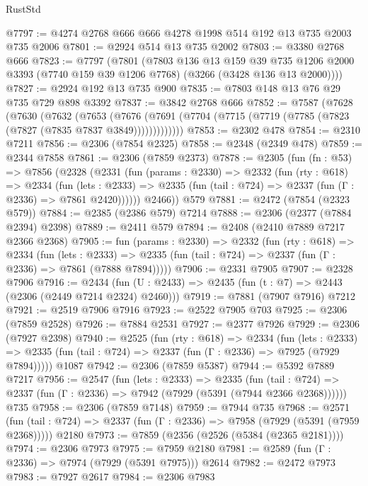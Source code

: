 \begin{lexlean}{RustStd}
\begin{coremodule}
@7797 := @4274 @2768 @666 @666 @4278 @1998 @514 @192 @13 @735 @2003 @735 @2006
@7801 := @2924 @514 @13 @735 @2002
@7803 := @3380 @2768 @666
@7823 := @7797
    (@7801
      (@7803
        @136
        @13
        @159
        @39
        @735
        @1206
        @2000
        @3393
        (@7740 @159 @39 @1206 @7768)
        (@3266 (@3428 @136 @13 @2000))))
@7827 := @2924 @192 @13 @735 @900
@7835 := @7803 @148 @13 @76 @29 @735 @729 @898 @3392
@7837 := @3842 @2768 @666
@7852 := @7587
    (@7628
      (@7630
        (@7632
          (@7653
            (@7676 (@7691 (@7704 (@7715 (@7719 (@7785 (@7823 (@7827 (@7835 @7837 @3849)))))))))))))
@7853 := @2302 @478
@7854 := @2310 @7211
@7856 := @2306 (@7854 @2325)
@7858 := @2348 (@2349 @478)
@7859 := @2344 @7858
@7861 := @2306 (@7859 @2373)
@7878 := @2305
    (fun (fn : @53) =>
    @7856
      (@2328
        (@2331
          (fun (params : @2330) =>
          @2332
            (fun (rty : @618) =>
            @2334
              (fun (lets : @2333) =>
              @2335 (fun (tail : @724) => @2337 (fun (Γ : @2336) => @7861 @2420))))))
        @2466))
    @579
@7881 := @2472 (@7854 (@2323 @579))
@7884 := @2385 (@2386 @579) @7214
@7888 := @2306 (@2377 (@7884 @2394) @2398)
@7889 := @2411 @579
@7894 := @2408 (@2410 @7889 @7217 @2366 @2368)
@7905 := fun (params : @2330) =>
  @2332
    (fun (rty : @618) =>
    @2334
      (fun (lets : @2333) =>
      @2335 (fun (tail : @724) => @2337 (fun (Γ : @2336) => @7861 (@7888 @7894)))))
@7906 := @2331 @7905
@7907 := @2328 @7906
@7916 := @2434 (fun (U : @2433) => @2435 (fun (t : @7) => @2443 (@2306 (@2449 @7214 @2324) @2460)))
@7919 := @7881 (@7907 @7916) @7212
@7921 := @2519 @7906 @7916
@7923 := @2522 @7905 @703
@7925 := @2306 (@7859 @2528)
@7926 := @7884 @2531
@7927 := @2377 @7926
@7929 := @2306 (@7927 @2398)
@7940 := @2525
    (fun (rty : @618) =>
    @2334
      (fun (lets : @2333) =>
      @2335 (fun (tail : @724) => @2337 (fun (Γ : @2336) => @7925 (@7929 @7894)))))
    @1087
@7942 := @2306 (@7859 @5387)
@7944 := @5392 @7889 @7217
@7956 := @2547
    (fun (lets : @2333) =>
    @2335
      (fun (tail : @724) => @2337 (fun (Γ : @2336) => @7942 (@7929 (@5391 (@7944 @2366 @2368))))))
    @735
@7958 := @2306 (@7859 @7148)
@7959 := @7944 @735
@7968 := @2571
    (fun (tail : @724) => @2337 (fun (Γ : @2336) => @7958 (@7929 (@5391 (@7959 @2368)))))
    @2180
@7973 := @7859 (@2356 (@2526 (@5384 (@2365 @2181))))
@7974 := @2306 @7973
@7975 := @7959 @2180
@7981 := @2589 (fun (Γ : @2336) => @7974 (@7929 (@5391 @7975))) @2614
@7982 := @2472 @7973
@7983 := @7927 @2617
@7984 := @2306 @7983

\end{coremodule}
\end{lexlean}
